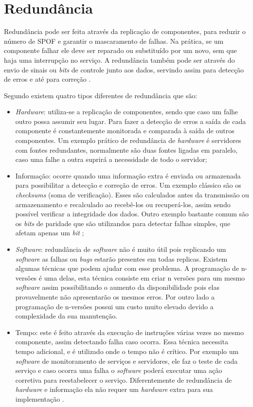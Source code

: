 \section{Redundância}
\label{section:redundancia}

Redundância pode ser feita através da replicação de componentes, para reduzir o número de \ac{SPOF} e garantir o mascaramento de falhas.
Na prática, se um componente falhar ele deve ser reparado ou substituído por um novo, sem que haja uma interrupção no serviço.
A redundância também pode ser através do envio de sinais ou \textit{bits} de controle junto aos dados, 
servindo assim para detecção de erros e até para correção \cite{weber2002}.

Segundo \cite{norvag2000} existem quatro tipos diferentes de redundância que são:
\begin{itemize}
 \item \textit{Hardware}: utiliza-se a replicação de componentes, sendo que caso um falhe outro possa assumir seu lugar. 
 Para fazer a detecção de erros a saída de cada componente é constantemente monitorada e comparada à saída de outros componentes.
 Um exemplo prático de redundância de \textit{hardware} é servidores com fontes redundantes, normalmente são duas fontes ligadas em paralelo, 
 caso uma falhe a outra suprirá a necessidade de todo o servidor;
 \item Informação: ocorre quando uma informação extra é enviada ou armazenada para possibilitar a detecção e correção de erros.
 Um exemplo clássico são os \textit{checksums} (soma de verificação). Esses são calculados antes da transmissão ou armazenamento 
 e recalculado ao recebê-los ou recuperá-los, assim sendo possível verificar a integridade dos dados. Outro exemplo bastante comum são os 
 \textit{bits} de paridade que são utilizandos para detectar falhas simples, que afetam apenas um \textit{bit} \cite{weber2002};
 \item \textit{Software}: redundância de \textit{software} não é muito útil pois replicando um \textit{software} as falhas ou 
 \textit{bugs} estarão presentes em todas replicas. Existem algumas técnicas que podem ajudar com esse problema. A programação 
 de n-versões é uma delas, esta técnica consiste em criar n versões para um mesmo \textit{software} assim possibilitando o aumento da 
 disponibilidade pois elas provavelmente não apresentarão os mesmos erros. Por outro lado a programação de n-versões possui um custo muito 
 elevado devido a complexidade da sua manutenção.
 \item Tempo: este é feito através da execução de instruções várias vezes no mesmo componente, assim detectando falha caso ocorra.
 Essa técnica necessita tempo adicional, e é utilizado onde o tempo não é crítico. Por exemplo um \textit{software} de monitoramento de serviços e
 servidores, ele faz o teste de cada serviço e caso ocorra uma falha o \textit{software} poderá executar uma ação corretiva para reestabelecer o
 serviço. Diferentemente de redundância de \textit{hardware} e informação ela não requer um \textit{hardware} extra para sua implementação 
 \cite{costa2009}.
\end{itemize}

